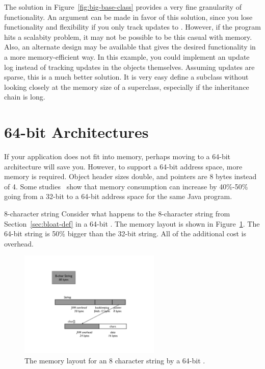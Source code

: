 The solution in Figure~\ref{fig:big-base-class} provides a very fine
granularity of functionality. An argument can be made in favor of this
solution, since you lose functionality and flexibility if you only track
updates to . However, if the program hits a scalabity
problem, it may not be possible to be this casual with memory. Also, an alternate design may be available that gives the desired functionality in a more memory-efficient way. In this example, you could implement an update log instead of tracking updates in the objects themselves. Assuming updates are sparse, this is a much better solution. It is very easy define a subclass without looking closely at the memory size of a superclass, especially if the inheritance chain is long.

\section{64-bit Architectures}

If your application does not fit into memory, perhaps moving to a 64-bit architecture will save you. However, to support a 64-bit address space, more memory is required. Object header sizes double, and pointers are 8 bytes instead of 4. Some studies~\cite{compressedAddress} show that memory consumption can increase by 40\%-50\% going from a 32-bit to a 64-bit address space for the same Java program.
\begin{example}{8-character string} 
Consider what happens to the 8-character string from
Section~\ref{sec:bloat-def} in a 64-bit \jre. The memory layout is shown in
Figure~\ref{fig:8-char-string-64-bit}. The 64-bit string is 50\% bigger than the 32-bit string. All of the additional cost is overhead.
\end{example} 
 \begin{figure}
  \centering
 \includegraphics[width=0.6\textwidth]{Figures/chapter4/8-char-string-64-bit.pdf}
  \caption{The memory layout for an 8 character string by a 64-bit \jre.}
  \label{fig:8-char-string-64-bit}
\end{figure}

